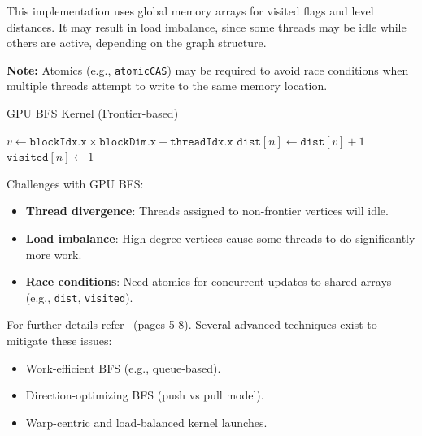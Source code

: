\documentclass[12pt]{book}
\begin{document}
This implementation uses global memory arrays for visited flags and level distances. It may result in load imbalance, since some threads may be idle while others are active, depending on the graph structure.

\textbf{Note:} Atomics (e.g., \texttt{atomicCAS}) may be required to avoid race conditions when multiple threads attempt to write to the same memory location.

\begin{algorithm}[H]
\caption{GPU BFS Kernel (Frontier-based)}
\label{alg:GPUBFS}
\begin{algorithmic}[1]
    \State $v \gets \texttt{blockIdx.x} \times \texttt{blockDim.x} + \texttt{threadIdx.x}$
                \State $\texttt{dist}[n] \gets \texttt{dist}[v] + 1$
                \State $\texttt{visited}[n] \gets 1$
            \EndIf
        \EndFor
    \EndIf
\EndProcedure
\end{algorithmic}
\end{algorithm}

\noindent
Challenges with GPU BFS:
\begin{itemize}
    \item \textbf{Thread divergence}: Threads assigned to non-frontier vertices will idle.
    \item \textbf{Load imbalance}: High-degree vertices cause some threads to do significantly more work.
    \item \textbf{Race conditions}: Need atomics for concurrent updates to shared arrays (e.g., \texttt{dist}, \texttt{visited}).
\end{itemize}
For further details refer~\cite{harish2007accelerating} (pages 5-8).
\bigskip
\noindent
Several advanced techniques exist to mitigate these issues:
\begin{itemize}
    \item Work-efficient BFS (e.g., queue-based).
    \item Direction-optimizing BFS (push vs pull model).
    \item Warp-centric and load-balanced kernel launches.
\end{itemize}
\end{document}
